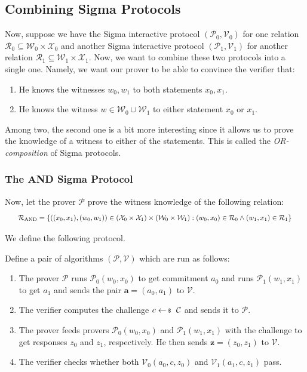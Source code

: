 \documentclass[../../book.tex]{subfiles}
\begin{document}
\subsection{Combining Sigma Protocols}

Now, suppose we have the Sigma interactive protocol $(\mathcal{P}_0,\mathcal{V}_0)$ for one relation $\mathcal{R}_0 \subseteq \mathcal{W}_0 \times \mathcal{X}_0$ and another Sigma interactive protocol $(\mathcal{P}_1,\mathcal{V}_1)$ for another relation $\mathcal{R}_1 \subseteq \mathcal{W}_1 \times \mathcal{X}_1$. Now, we want to combine these two protocols into a single one. Namely, we want our prover to be able to convince the verifier that:
\begin{enumerate}
    \item He knows the witnesses $w_0,w_1$ to both statements $x_0,x_1$.
    \item He knows the witness $w \in \mathcal{W}_0 \cup \mathcal{W}_1$ to either statement $x_0$ or $x_1$.
\end{enumerate}

Among two, the second one is a bit more interesting since it allows us to prove the knowledge of a witness to either of the statements. This is called the \textit{OR-composition} of Sigma protocols.

\subsubsection{The AND Sigma Protocol}

Now, let the prover $\mathcal{P}$ prove the witness knowledge of the following relation:
\begin{equation*}
    \scalebox{0.85}{$
        \mathcal{R}_{\text{AND}} = \left\{ ((x_0,x_1), (w_0,w_1)) \in (\mathcal{X}_0 \times \mathcal{X}_1) \times (\mathcal{W}_0 \times \mathcal{W}_1): (w_0,x_0) \in \mathcal{R}_0 \wedge (w_1,x_1) \in \mathcal{R}_1 \right\}
    $}
\end{equation*}

We define the following protocol.

\begin{definition}
    Define a pair of algorithms $(\mathcal{P},\mathcal{V})$ which are run as follows:
    \begin{enumerate}
        \item The prover $\mathcal{P}$ runs $\mathcal{P}_0(w_0,x_0)$ to get commitment $a_0$ and runs $\mathcal{P}_1(w_1,x_1)$ to get $a_1$ and sends the pair $\mathbf{a} = (a_0,a_1)$ to $\mathcal{V}$.
        \item The verifier computes the challenge $c \leftarrowS \mathcal{C}$ and sends it to $\mathcal{P}$.
        \item The prover feeds provers $\mathcal{P}_0(w_0,x_0)$ and $\mathcal{P}_1(w_1,x_1)$ with the challenge to get responses $z_0$ and $z_1$, respectively. He then sends $\mathbf{z} = (z_0,z_1)$ to $\mathcal{V}$.
        \item The verifier checks whether both $\mathcal{V}_0(a_0,c,z_0)$ and $\mathcal{V}_1(a_1,c,z_1)$ pass.
    \end{enumerate}
\end{definition}
\end{document}
